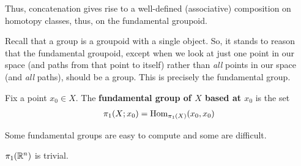 Thus, concatenation gives rise to a well-defined (associative) composition on homotopy classes, thus, on the fundamental groupoid.

Recall that a group is a groupoid with a single object. So, it stands to reason that the fundamental groupoid, except when we look at just one point in our space (and paths from that point to itself) rather than \textit{all} points in our space (and \textit{all} paths), should be a group. This is precisely the fundamental group.

\begin{boxdefinition}
    Fix a point $x_0 \in X$. The \textbf{fundamental group of $X$ based at $x_0$} is the set
    \begin{align*}
        \pi_1\!\left( X; x_0 \right) = \operatorname{Hom}_{\pi_1(X)}\!\left( x_0, x_0 \right)
    \end{align*}
\end{boxdefinition}

Some fundamental groups are easy to compute and some are difficult.

\begin{boxexample}
    $\pi_1\!\left( \mathbb{R}^n \right)$ is trivial.
\end{boxexample}

